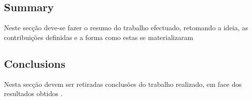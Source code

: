 \documentclass{llncs}
\begin{document}
\subsection{Summary} %
Neste secção deve-se fazer o resumo do trabalho efectuado, retomando a ideia, as contribuições definidas e a forma como estas se materializaram

\subsection{Conclusions} %
Nesta secção devem ser retiradas conclusões do trabalho realizado, em face dos resultados obtidos \cite{exemplo}.




\end{document}
